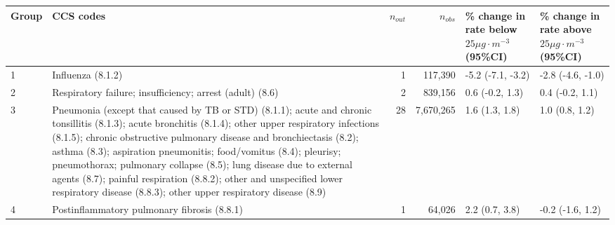 \begin{tabular}{lp{6.5cm}rrp{2.2cm}p{2.2cm}}
  \hline
Group & CCS codes & $n_{out}$ & $n_{obs}$ & \% change in rate below $25 \mu g \cdot m^{-3}$ (95\%CI) & \% change in rate above $25 \mu g \cdot m^{-3}$ (95\%CI) \\ 
  \hline
 1 & Influenza (8.1.2) &  1 & 117,390 & -5.2 (-7.1, -3.2) & -2.8 (-4.6, -1.0) \\ 
   2 & Respiratory failure; insufficiency; arrest (adult) (8.6) &  2 & 839,156 & 0.6 (-0.2, 1.3) & 0.4 (-0.2, 1.1) \\ 
   3 & Pneumonia (except that caused by TB or STD) (8.1.1); acute and chronic tonsillitis (8.1.3); acute bronchitis (8.1.4); other upper respiratory infections (8.1.5); chronic obstructive pulmonary disease and bronchiectasis (8.2); asthma (8.3); aspiration pneumonitis; food/vomitus (8.4); pleurisy; pneumothorax; pulmonary collapse (8.5); lung disease due to external agents (8.7); painful respiration (8.8.2); other and unspecified lower respiratory disease (8.8.3); other upper respiratory disease (8.9) & 28 & 7,670,265 & 1.6 (1.3, 1.8) & 1.0 (0.8, 1.2) \\ 
   4 & Postinflammatory pulmonary fibrosis (8.8.1) &  1 & 64,026 & 2.2 (0.7, 3.8) & -0.2 (-1.6, 1.2) \\ 
   \hline
\end{tabular}

